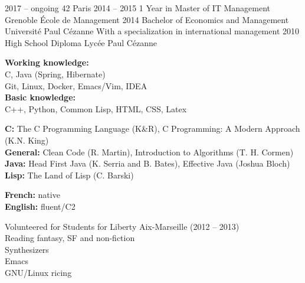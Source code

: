\documentclass[10pt]{cv}
\begin{document}

\vspace{-3mm}
\begin{entrylist}
  \smallentry
    {2017 -- ongoing}
    {42 Paris}
    {}
  \smallentry
    {2014 -- 2015}
    {1 Year in Master of IT Management}
    {Grenoble École de Management}
  \entry
    {2014}
    {Bachelor of Economics and Management}
    {Université Paul Cézanne}
    {With a specialization in international management}
  \smallentry
    {2010}
    {High School Diploma}
    {Lycée Paul Cézanne}
\end{entrylist}

\vspace{-2mm}


\begin{minipage}[t]{0.49\textwidth}
\textbf{Working knowledge:}\\[0.5ex]
C, Java (Spring, Hibernate)\\[0.5ex]
Git, Linux, Docker, Emacs/Vim, IDEA\\[1.2ex]
\textbf{Basic knowledge:}\\[0.5ex]
C++, Python, Common Lisp, HTML, CSS, Latex
\end{minipage}
\hfill
%
%
\begin{minipage}[t]{0.49\textwidth}
\textbf{C:} The C Programming Language (K\&R), C Programming: A Modern Approach (K.N. King)\\[1.2ex]
\textbf{General:} Clean Code (R. Martin), Introduction to Algorithms (T. H. Cormen)\\[1.2ex]
\textbf{Java:} Head First Java (K. Serria and B. Bates), Effective Java (Joshua Bloch)\\[1.2ex]
\textbf{Lisp:} The Land of Lisp (C. Barski)
\end{minipage}


\begin{minipage}[t]{0.49\textwidth}
\textbf{French:} native\\[1.5ex]
\textbf{English:} fluent/C2
\end{minipage}
\hfill
%
%
\begin{minipage}[t]{0.49\textwidth}
Volunteered for Students for Liberty Aix-Marseille (2012 -- 2013)\\[0.5ex]
Reading fantasy, SF and non-fiction\\[0.5ex]
Synthesizers\\[0.5ex]
Emacs\\[0.5ex]
GNU/Linux ricing


\end{minipage}
\end{document}
